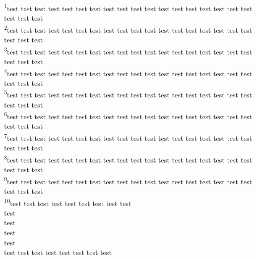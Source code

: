 \documentclass[10pt,twocolumn]{memoir}
\newcommand{\verseref}[2]{\textsuperscript{#2}}
\begin{document}
\noindent
\verseref{3}{1}test test test test test test test test test test test test test test test test test test test test test\\ 
\verseref{3}{2}test test test test test test test test test test test test test test test test test test test test test\\ 
\verseref{3}{3}test test test test test test test test test test test test test test test test test test test test test\\ 
\verseref{3}{4}test test test test test test test test test test test test test test test test test test test test test\\ 
\verseref{3}{5}test test test test test test test test test test test test test test test test test test test test test\\ 
\verseref{3}{6}test test test test test test test test test test test test test test test test test test test test test\\ 
\verseref{3}{7}test test test test test test test test test test test test test test test test test test test test test\\ 
\verseref{3}{8}test test test test test test test test test test test test test test test test test test test test test\\ 
\verseref{3}{9}test test test test test test test test test test test test test test test test test test test test test\\ 
\verseref{3}{10}test test test test test test test test test\\ test\\ test\\ test\\ test\\ test test test test test test test test\\


\end{document}
